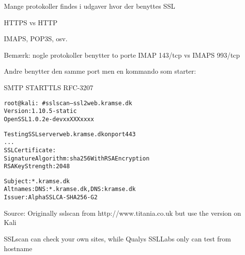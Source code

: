 \documentclass[Screen16to9,17pt]{foils}
\begin{document}

\begin{list1}
\item Mange protokoller findes i udgaver hvor der benyttes SSL
\item HTTPS vs HTTP
\item IMAPS, POP3S, osv.
\item Bemærk: nogle protokoller benytter to porte IMAP 143/tcp vs IMAPS 993/tcp
\item Andre benytter den samme port men en kommando som starter:
\item SMTP STARTTLS RFC-3207
\end{list1}




\begin{alltt}\small
root@kali:~# sslscan --ssl2 web.kramse.dk
Version: 1.10.5-static
OpenSSL 1.0.2e-dev xx XXX xxxx

Testing SSL server web.kramse.dk on port 443
...
  SSL Certificate:
Signature Algorithm: sha256WithRSAEncryption
RSA Key Strength:    2048

Subject:  *.kramse.dk
Altnames: DNS:*.kramse.dk, DNS:kramse.dk
Issuer:   AlphaSSL CA - SHA256 - G2
\end{alltt}

Source:
Originally sslscan from http://www.titania.co.uk
 but use the version on Kali

SSLscan can check your own sites, while Qualys SSLLabs only can test from hostname




\slidenext{}
\end{document}
